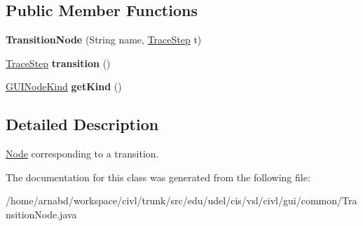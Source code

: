 \subsection*{Public Member Functions}
\begin{DoxyCompactItemize}
\item 
\hypertarget{classedu_1_1udel_1_1cis_1_1vsl_1_1civl_1_1gui_1_1common_1_1TransitionNode_a915a3bef265bc610f36adbb3fba2ddd9}{}{\bfseries Transition\+Node} (String name, \hyperlink{interfaceedu_1_1udel_1_1cis_1_1vsl_1_1civl_1_1kripke_1_1IF_1_1TraceStep}{Trace\+Step} t)\label{classedu_1_1udel_1_1cis_1_1vsl_1_1civl_1_1gui_1_1common_1_1TransitionNode_a915a3bef265bc610f36adbb3fba2ddd9}

\item 
\hypertarget{classedu_1_1udel_1_1cis_1_1vsl_1_1civl_1_1gui_1_1common_1_1TransitionNode_a4e8f005890629b239a13df7d46f31f0d}{}\hyperlink{interfaceedu_1_1udel_1_1cis_1_1vsl_1_1civl_1_1kripke_1_1IF_1_1TraceStep}{Trace\+Step} {\bfseries transition} ()\label{classedu_1_1udel_1_1cis_1_1vsl_1_1civl_1_1gui_1_1common_1_1TransitionNode_a4e8f005890629b239a13df7d46f31f0d}

\item 
\hypertarget{classedu_1_1udel_1_1cis_1_1vsl_1_1civl_1_1gui_1_1common_1_1TransitionNode_ad939a67c9db6a119940451834edb44aa}{}\hyperlink{enumedu_1_1udel_1_1cis_1_1vsl_1_1civl_1_1gui_1_1common_1_1GUINODE_1_1GUINodeKind}{G\+U\+I\+Node\+Kind} {\bfseries get\+Kind} ()\label{classedu_1_1udel_1_1cis_1_1vsl_1_1civl_1_1gui_1_1common_1_1TransitionNode_ad939a67c9db6a119940451834edb44aa}

\end{DoxyCompactItemize}


\subsection{Detailed Description}
\hyperlink{structNode}{Node} corresponding to a transition. 

The documentation for this class was generated from the following file\+:\begin{DoxyCompactItemize}
\item 
/home/arnabd/workspace/civl/trunk/src/edu/udel/cis/vsl/civl/gui/common/Transition\+Node.\+java\end{DoxyCompactItemize}
